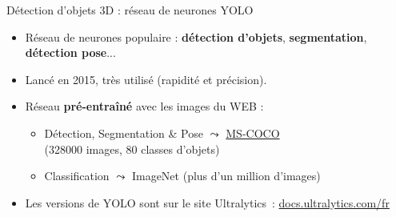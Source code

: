 \documentclass[11pt,serif,mathserif,compress,hyperref={colorlinks}]{beamer}
\begin{document}
\begin{frame}{Détection d'objets 3D : réseau de neurones YOLO}
  
  \begin{tcolorbox}[title={Réseau de neurones \textbf{YOLO} ({\em You Only Look Once})}]
    \begin{itemize}
      \item<1-> Réseau de neurones populaire : \textbf{détection d'objets}, \textbf{segmentation}, \textbf{détection pose}...
      \item<1-> Lancé en 2015, très utilisé (rapidité et précision).
      \item<2-> Réseau \textbf{pré-entraîné} avec les images du WEB :
        \begin{itemize}
        \item Détection, Segmentation \& Pose $\leadsto$ \href{https://paperswithcode.com/dataset/coco}{MS-COCO}\\
          (328000 images, 80 classes d'objets)
        \item Classification $\leadsto$ ImageNet (plus d'un million d'images)
        \end{itemize}
      \item<3-> Les versions de YOLO sont sur le site Ultralytics : \href{https://docs.ultralytics.com/fr}{docs.ultralytics.com/fr}
    \end{itemize}
  \end{tcolorbox}
    
\end{frame}
\end{document}
